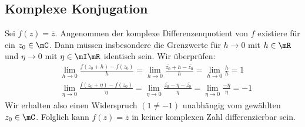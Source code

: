 \subsection{Komplexe Konjugation}
Sei $f(z)=\bar{z}$. Angenommen der komplexe Differenzenquotient von $f$ existiere für ein $z_{0}\in\mC$. Dann müssen insbesondere die Grenzwerte für $h\to0$ mit $h\in\mR$ und $\eta\to0$ mit $\eta\in\mI\mR$ identisch sein. Wir überprüfen:
\begin{align*}
    &\lim_{h\to0}\frac{f(z_{0}+h)-f(z_{0})}{h}=\lim_{h\to0}\frac{\bar{z_{0}}+h-\bar{z_{0}}}{h}=\lim_{h\to0}\frac{h}{h}=1\\
    &\lim_{\eta\to0}\frac{f(z_{0}+\eta)-f(z_{0})}{\eta}=\lim_{\eta\to0}\frac{\bar{z_{0}}-\eta-\bar{z_{0}}}{\eta}=\lim_{\eta\to0}\frac{-\eta}{\eta}=-1
\end{align*}
Wir erhalten also einen Widerspruch $(1\neq-1)$ unabhängig vom gewählten $z_{0}\in\mC$. Folglich kann $f(z)=\bar{z}$ in keiner komplexen Zahl differenzierbar sein.
